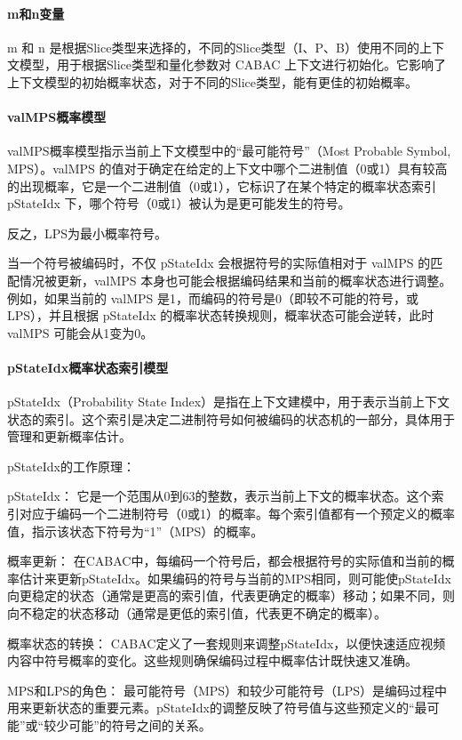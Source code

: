 \documentclass{/Users/hi/Study/template/code}
\begin{document}
\paragraph{m和n变量}
m 和 n 是根据Slice类型来选择的，不同的Slice类型（I、P、B）使用不同的上下文模型，用于根据Slice类型和量化参数对 CABAC 上下文进行初始化。它影响了上下文模型的初始概率状态，对于不同的Slice类型，能有更佳的初始概率。

\paragraph{valMPS概率模型}
\begin{definition}
	valMPS概率模型指示当前上下文模型中的“最可能符号”（Most Probable Symbol, MPS）。valMPS 的值对于确定在给定的上下文中哪个二进制值（0或1）具有较高的出现概率，它是一个二进制值（0或1），它标识了在某个特定的概率状态索引 pStateIdx 下，哪个符号（0或1）被认为是更可能发生的符号。
\end{definition}
\begin{remark}
	反之，LPS为最小概率符号。
\end{remark}

当一个符号被编码时，不仅 pStateIdx 会根据符号的实际值相对于 valMPS 的匹配情况被更新，valMPS 本身也可能会根据编码结果和当前的概率状态进行调整。例如，如果当前的 valMPS 是1，而编码的符号是0（即较不可能的符号，或LPS），并且根据 pStateIdx 的概率状态转换规则，概率状态可能会逆转，此时 valMPS 可能会从1变为0。

\paragraph{pStateIdx概率状态索引模型}
\begin{definition}
	pStateIdx（Probability State Index）是指在上下文建模中，用于表示当前上下文状态的索引。这个索引是决定二进制符号如何被编码的状态机的一部分，具体用于管理和更新概率估计。
\end{definition}

pStateIdx的工作原理：
\begin{serialNumber}
	\item pStateIdx： 它是一个范围从0到63的整数，表示当前上下文的概率状态。这个索引对应于编码一个二进制符号（0或1）的概率。每个索引值都有一个预定义的概率值，指示该状态下符号为“1”（MPS）的概率。
	\item 概率更新： 在CABAC中，每编码一个符号后，都会根据符号的实际值和当前的概率估计来更新pStateIdx。如果编码的符号与当前的MPS相同，则可能使pStateIdx向更稳定的状态（通常是更高的索引值，代表更确定的概率）移动；如果不同，则向不稳定的状态移动（通常是更低的索引值，代表更不确定的概率）。
	\item 概率状态的转换： CABAC定义了一套规则来调整pStateIdx，以便快速适应视频内容中符号概率的变化。这些规则确保编码过程中概率估计既快速又准确。
	\item MPS和LPS的角色： 最可能符号（MPS）和较少可能符号（LPS）是编码过程中用来更新状态的重要元素。pStateIdx的调整反映了符号值与这些预定义的“最可能”或“较少可能”的符号之间的关系。
\end{serialNumber}
\end{document}
